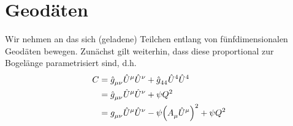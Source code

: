  \section{Geodäten}
 Wir nehmen an das sich (geladene) Teilchen entlang von fünfdimensionalen
 Geodäten bewegen. 
 Zunächst gilt weiterhin, dass diese proportional zur Bogelänge parametrisiert
 sind, d.h.
 \begin{equation}
 \begin{split}
  C&=
  \tensor{\hat{g}}{_\mu_\nu}\tensor{\hat{U}}{^\mu}\tensor{\hat{U}}{^\nu}
  +\tensor{\hat{g}}{_4_4}\tensor{\hat{U}}{^4}\tensor{\hat{U}}{^4}\\\
 &=\tensor{\hat{g}}{_\mu_\nu}\tensor{\hat{U}}{^\mu}\tensor{\hat{U}}{^\nu}
 +\psi Q^2\\
  &=\tensor{g}{_\mu_\nu}\tensor{\hat{U}}{^\mu}\tensor{\hat{U}}{^\nu}
  -\psi\left(\tensor{A}{_\mu}\tensor{\hat{U}}{^\mu}\right)^2
 +\psi Q^2\\
 \end{split}
 \end{equation}
